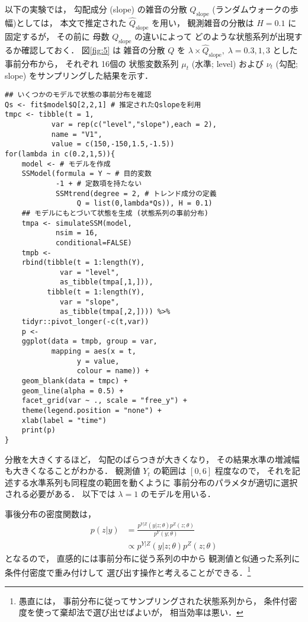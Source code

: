 \documentclass[10pt,oneside,fleqn]{scrartcl}
\begin{document}
以下の実験では，
勾配成分 (slope) の雑音の分散 \(Q_{\mathrm{slope}}\)
(ランダムウォークの歩幅)としては，
本文で推定された \(\hat{Q}_{\mathrm{slope}}\) を用い，
観測雑音の分散は \(H=0.1\) に固定するが，
その前に 母数 \(Q_{\mathrm{slope}}\) の違いによって
どのような状態系列が出現するか確認しておく．
図\ref{fig:5} は
雑音の分散 \(Q\) を
\(\lambda\times \hat{Q}_{\mathrm{slope}},\;\lambda=0.3,1,3\)
とした事前分布から，
それぞれ
16個の
状態変数系列
\(\mu_{t}\) (水準; level)
および
\(\nu_{t}\) (勾配; slope)
をサンプリングした結果を示す．

\begin{figure*}[htbp]
  \centering
\end{figure*}

\begin{verbatim}
## いくつかのモデルで状態の事前分布を確認
Qs <- fit$model$Q[2,2,1] # 推定されたQslopeを利用
tmpc <- tibble(t = 1,
	       var = rep(c("level","slope"),each = 2),
	       name = "V1",
	       value = c(150,-150,1.5,-1.5))
for(lambda in c(0.2,1,5)){
    model <- # モデルを作成
	SSModel(formula = Y ~ # 目的変数
		    -1 + # 定数項を持たない
		    SSMtrend(degree = 2, # トレンド成分の定義
			     Q = list(0,lambda*Qs)), H = 0.1)
    ## モデルにもとづいて状態を生成 (状態系列の事前分布)
    tmpa <- simulateSSM(model,
			nsim = 16,
			conditional=FALSE)
    tmpb <- 
	rbind(tibble(t = 1:length(Y),
		     var = "level",
		     as_tibble(tmpa[,1,])),
	      tibble(t = 1:length(Y),
		     var = "slope",
		     as_tibble(tmpa[,2,]))) %>%
	tidyr::pivot_longer(-c(t,var)) 
    p <- 
	ggplot(data = tmpb, group = var,
	       mapping = aes(x = t,
			     y = value,
			     colour = name)) +
	geom_blank(data = tmpc) +
	geom_line(alpha = 0.5) +
	facet_grid(var ~ ., scale = "free_y") +
	theme(legend.position = "none") +
	xlab(label = "time")
    print(p)
}
\end{verbatim}

分散を大きくするほど，
勾配のばらつきが大きくなり，
その結果水準の増減幅も大きくなることがわかる．
観測値 \(Y_{t}\) の範囲は \([0,6]\) 程度なので，
それを記述する水準系列も同程度の範囲を動くように
事前分布のパラメタが適切に選択される必要がある．
以下では
\(\lambda=1\)
のモデルを用いる．

事後分布の密度関数は，
\begin{align}
  p(z|y)
  &=\frac{p^{Y|Z}(y|z;\theta)p^{Z}(z;\theta)}{p^{Y}(y;\theta)}\\
  &\propto p^{Y|Z}(y|z;\theta)p^{Z}(z;\theta)
\end{align}
となるので，
直感的には事前分布に従う系列の中から
観測値と似通った系列に条件付密度で重み付けして
選び出す操作と考えることができる．\footnote{愚直には，
事前分布に従ってサンプリングされた状態系列から，
条件付密度を使って棄却法で選び出せばよいが，
相当効率は悪い．}
\end{document}

